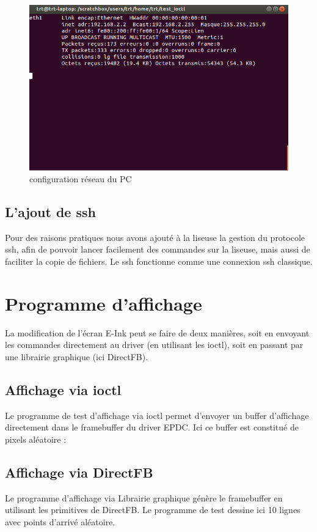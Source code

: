 \begin{figure}[]
	\begin{center}
		\includegraphics[scale=0.5]{capt_pc_ifconfig.png}
	\end{center}
	\caption{configuration réseau du PC}
\end{figure}
\clearpage
\subsection{L'ajout de ssh}
Pour des raisons pratiques nous avons ajouté à la liseuse la gestion du protocole ssh, afin de pouvoir lancer facilement des commandes sur la liseuse, mais aussi de faciliter la copie de fichiers.
Le ssh fonctionne comme une connexion ssh classique.

\section{Programme d'affichage}

La modification de l'écran E-Ink peut se faire de deux manières, soit en envoyant les commandes directement au driver (en utilisant les ioctl), soit en passant par une librairie graphique (ici DirectFB).

\subsection{Affichage via ioctl}

Le programme de test d'affichage via ioctl permet d'envoyer un buffer d'affichage directement dans le framebuffer du driver EPDC.
Ici ce buffer est constitué de pixels aléatoire : 

\subsection{Affichage via DirectFB}

Le programme d'affichage via Librairie graphique génère le framebuffer en utilisant les primitives de DirectFB.
Le programme de test dessine ici 10 lignes avec points d'arrivé aléatoire.


